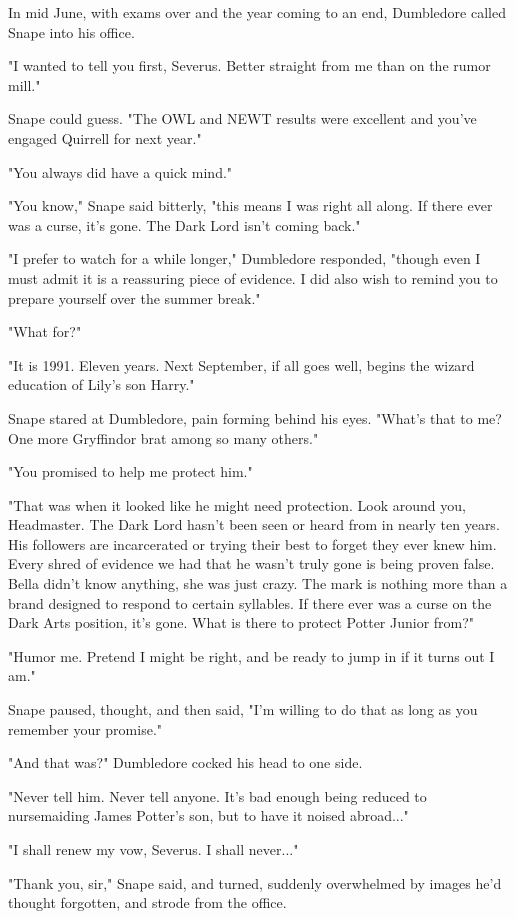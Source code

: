 In mid June, with exams over and the year coming to an end, Dumbledore called Snape into his office.

"I wanted to tell you first, Severus. Better straight from me than on the rumor mill."

Snape could guess. "The OWL and NEWT results were excellent and you've engaged Quirrell for next year."

"You always did have a quick mind."

"You know," Snape said bitterly, "this means I was right all along. If there ever was a curse, it's gone. The Dark Lord isn't coming back."

"I prefer to watch for a while longer," Dumbledore responded, "though even I must admit it is a reassuring piece of evidence. I did also wish to remind you to prepare yourself over the summer break."

"What for?"

"It is 1991. Eleven years. Next September, if all goes well, begins the wizard education of Lily's son Harry."

Snape stared at Dumbledore, pain forming behind his eyes. "What's that to me? One more Gryffindor brat among so many others."

"You promised to help me protect him."

"That was when it looked like he might need protection. Look around you, Headmaster. The Dark Lord hasn't been seen or heard from in nearly ten years. His followers are incarcerated or trying their best to forget they ever knew him. Every shred of evidence we had that he wasn't truly gone is being proven false. Bella didn't know anything, she was just crazy. The mark is nothing more than a brand designed to respond to certain syllables. If there ever was a curse on the Dark Arts position, it's gone. What is there to protect Potter Junior from?"

"Humor me. Pretend I might be right, and be ready to jump in if it turns out I am."

Snape paused, thought, and then said, "I'm willing to do that as long as you remember your promise."

"And that was?" Dumbledore cocked his head to one side.

"Never tell him. Never tell anyone. It's bad enough being reduced to nursemaiding James Potter's son, but to have it noised abroad..."

"I shall renew my vow, Severus. I shall never..."

"Thank you, sir," Snape said, and turned, suddenly overwhelmed by images he'd thought forgotten, and strode from the office.


